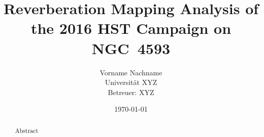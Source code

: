 \documentclass[a4paper,12pt]{report}
\title{\textbf{Reverberation Mapping Analysis of the 2016 HST Campaign on NGC 4593}}
\author{Vorname Nachname \\ Universität XYZ \\ Betreuer: XYZ}
\date{\today}
\begin{document}
	
	\maketitle
	\thispagestyle{empty}
	\newpage
	
	\begin{abstract}
		Abstract
	\end{abstract}
	\newpage
	
	\tableofcontents
	\newpage
	
	\listoffigures
	\listoftables
	\newpage
	
	
	
	
	
	
	
	
	\printbibliography
	\appendix
	
	
\end{document}
